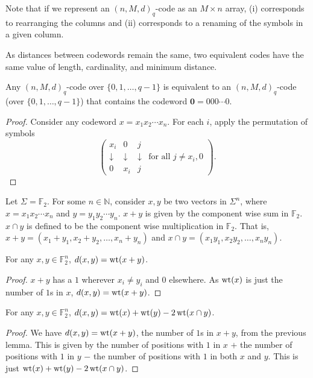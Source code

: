 Note that if we represent an $(n,M,d)_q$-code as an $M\times n$ array, (i) corresponds to rearranging the columns and (ii) corresponds to a renaming of the symbols in a given column.

As distances between codewords remain the same, two equivalent codes have the same value of length, cardinality, and minimum distance.

\begin{lemma}
    Any $(n,M,d)_q$-code over $\{0,1,\ldots,q-1\}$ is equivalent to an $(n,M,d)_q$-code (over $\{0,1,\ldots,q-1\}$) that contains the codeword $\textbf{0}=000\cdots 0$.
\end{lemma}
\begin{proof}
    Consider any codeword $x=x_1x_2\cdots x_n$. For each $i$, apply the permutation of symbols
    $$\left(\begin{matrix}x_i & 0 & j & \\ \downarrow & \downarrow & \downarrow & \text{for all $j\neq x_i,0$} \\ 0 & x_i & j & \end{matrix}\right).$$
\end{proof}

Let $\Sigma=\mathbb{F}_2$. For some $n\in\mathbb{N}$, consider $x,y$ be two vectors in $\Sigma^n$, where $x=x_1x_2\cdots x_n$ and $y=y_1y_2\cdots y_n$. $x+y$ is given by the component wise sum in $\mathbb{F}_2$. $x\cap y$ is defined to be the component wise multiplication in $\mathbb{F}_2$. That is, $x+y=(x_1+y_1, x_2+y_2, \ldots, x_n+y_n)$ and $x\cap y=(x_1y_1, x_2y_2,\ldots, x_ny_n)$.
    
\begin{lemma}
    For any $x,y\in\mathbb{F}_2^n$, $d(x,y)=\operatorname{wt}(x+y)$.
\end{lemma}
\begin{proof}
    $x+y$ has a $1$ wherever $x_i\neq y_i$ and $0$ elsewhere. As $\operatorname{wt}(x)$ is just the number of $1$s in $x$, $d(x,y)=\operatorname{wt}(x+y)$.
\end{proof}

\begin{lemma}
\label{BinaryDistancePIE}
    For any $x,y\in\mathbb{F}_2^n$, $d(x,y)=\operatorname{wt}(x)+\operatorname{wt}(y)-2\operatorname{wt}(x\cap y)$.
\end{lemma}
\begin{proof}
    We have $d(x,y)=\operatorname{wt}(x+y)$, the number of $1$s in $x+y$, from the previous lemma. This is given by the number of positions with $1$ in $x$ $+$ the number of positions with $1$ in $y$ $-$ the number of positions with $1$ in both $x$ and $y$. This is just $\operatorname{wt}(x)+\operatorname{wt}(y)-2\operatorname{wt}(x\cap y)$.
\end{proof}

